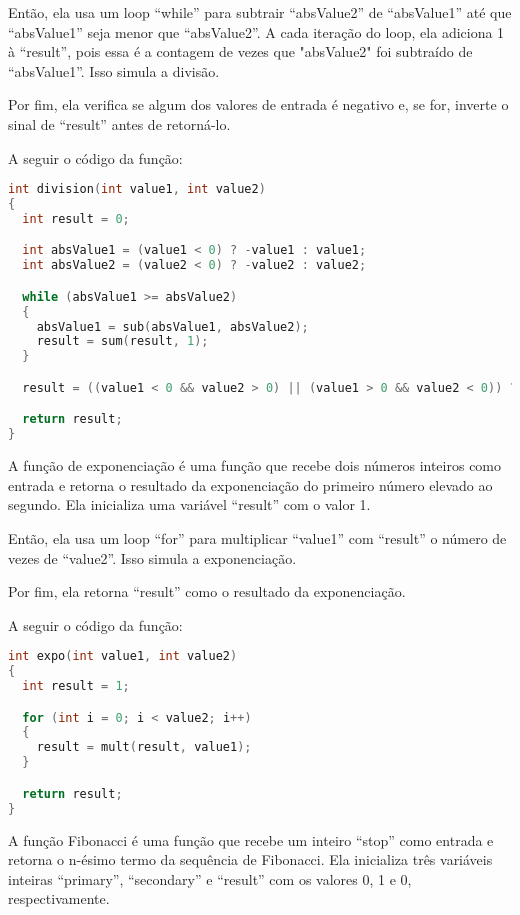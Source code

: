 \documentclass{article}
\begin{document}
Então, ela usa um loop “while” para subtrair “absValue2” de “absValue1” até que “absValue1” seja menor que “absValue2”. A cada iteração do loop, ela adiciona 1 à “result”, pois essa é a contagem de vezes que "absValue2" foi subtraído de “absValue1”. Isso simula a divisão.

Por fim, ela verifica se algum dos valores de entrada é negativo e, se for, inverte o sinal de “result” antes de retorná-lo.

\hfill\breakline

 \noindent A seguir o código da função:
 \begin{lstlisting}[caption={Função de divisão.},label={lst:cod4},language=C]
int division(int value1, int value2)
{
  int result = 0;

  int absValue1 = (value1 < 0) ? -value1 : value1;
  int absValue2 = (value2 < 0) ? -value2 : value2;

  while (absValue1 >= absValue2)
  {
    absValue1 = sub(absValue1, absValue2);
    result = sum(result, 1);
  }

  result = ((value1 < 0 && value2 > 0) || (value1 > 0 && value2 < 0)) ? -result : result;

  return result;
}
 \end{lstlisting}
 A função de exponenciação é uma função que recebe dois números inteiros como entrada e retorna o resultado da exponenciação do primeiro número elevado ao segundo. Ela inicializa uma variável “result” com o valor 1.

Então, ela usa um loop “for” para multiplicar “value1” com “result” o número de vezes de “value2”. Isso simula a exponenciação.

Por fim, ela retorna “result” como o resultado da exponenciação.


\hfill\breakline

 \noindent A seguir o código da função:
 \begin{lstlisting}[caption={Função de exponenciação.},label={lst:cod4},language=C]
int expo(int value1, int value2)
{
  int result = 1;

  for (int i = 0; i < value2; i++)
  {
    result = mult(result, value1);
  }

  return result;
}
 \end{lstlisting}
 A função Fibonacci é uma função que recebe um inteiro “stop” como entrada e retorna o n-ésimo termo da sequência de Fibonacci. Ela inicializa três variáveis inteiras “primary”,  “secondary” e “result” com os valores 0, 1 e 0, respectivamente.
\end{document}
